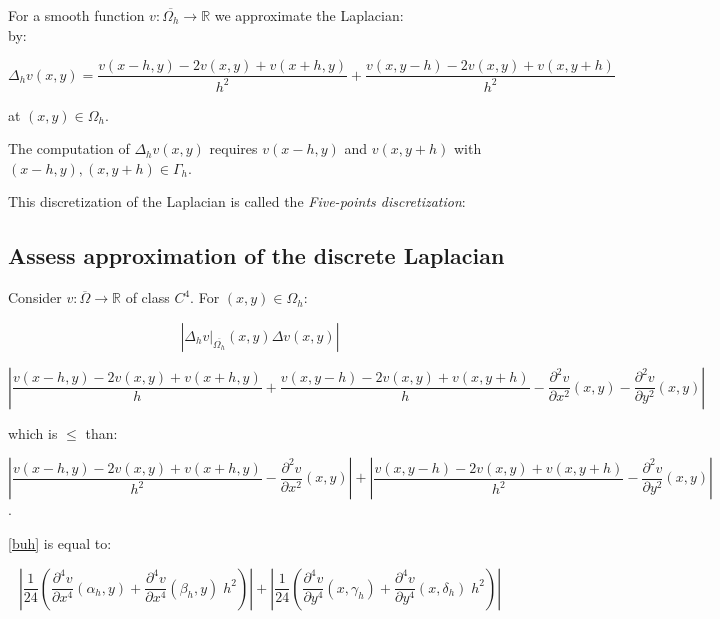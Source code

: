 For a smooth function $v: \overline{\Omega_h} \rightarrow \mathbb{R}$ we approximate the Laplacian:\\



by:

\begin{equation}
\Delta_h v(x, y) = \frac{v(x-h, y) - 2v(x,y) + v(x+h, y)}{h^2} + \frac{v(x, y-h) - 2v(x,y) + v(x, y+h)}{h^2}
\end{equation}

at $(x, y) \in \Omega_h$.


The computation of $\Delta_h v(x, y)$ requires $v(x-h, y)$ and $v(x, y+h)$ with $(x-h, y), (x, y+h) \in \Gamma_h$.

This discretization of the Laplacian is called the \textit{Five-points discretization}:



\subsection{Assess approximation of the discrete Laplacian}

Consider $v: \overline{\Omega} \rightarrow \mathbb{R}$ of class $C^4$. For $(x, y) \in \Omega_h$:

\begin{equation}
|\Delta_h v {|}_{\overline{\Omega_h}} (x,y) \Delta v(x,y)|
\end{equation}

\begin{equation}
|\frac{v(x-h, y)  - 2v(x, y) + v(x+h, y)}{h} + \frac{v(x, y-h) - 2v(x, y) + v(x, y+h)}{h} - \frac{\partial^2 v}{\partial x^2}(x, y) - \frac{\partial^2 v}{\partial y^2}(x, y)|
\end{equation}

which is $\leq$ than: 

\begin{equation}
|\frac{v(x-h, y) - 2v(x, y) + v(x+h, y)}{h^2} - \frac{\partial^2 v}{\partial x^2}(x, y)| + |\frac{v(x, y-h) - 2v(x, y) + v(x, y+h)}{h^2} - \frac{\partial^2 v}{\partial y^2}(x, y)|
\label{buh}
\end{equation}
.

\ref{buh} is equal to:

\begin{equation}
|\frac{1}{24} ( \frac{\partial^4 v}{\partial x^4}(\alpha_h, y) + \frac{\partial^4 v}{\partial x^4}(\beta_h, y) \; h^2) | + |\frac{1}{24} ( \frac{\partial^4 v}{\partial y^4}(x, \gamma_h) + \frac{\partial^4 v}{\partial y^4}(x, \delta_h) \; h^2) |
\label{buh2}
\end{equation}

